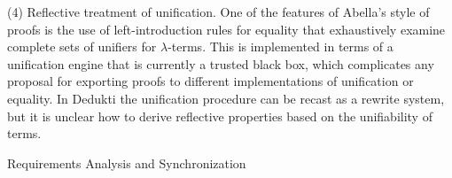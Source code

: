 \begin{workpackage}[id=theories,wphases=0-48,type=RTD,
  short=Theories in Dedukti,%
  title= Defining theories in Dedukti,
  lead=Inn,
  InnRM=10]
\begin{tasklist}
\begin{task}[id=abella,title=Express the theory of Abella in Dedukti and instrument the system]
(4) Reflective treatment of unification. One of the features of
Abella's style of proofs is the use of left-introduction rules for
equality that exhaustively examine complete sets of unifiers for
$\lambda$-terms. This is implemented in terms of a unification engine
that is currently a trusted black box, which complicates any proposal
for exporting proofs to different implementations of unification or
equality. In Dedukti the unification procedure can be recast as a
rewrite system, but it is unclear how to derive reflective properties
based on the unifiability of terms.
\end{task}

\begin{task}[title=id=hott,title=expressing HoTT]
\end{task}
\end{tasklist}

\begin{wpdelivs}
  \begin{wpdeliv}[due=3,miles=startup,id=requirements,dissem=PU,nature=DEM,lead=INR]
      {Requirements Analysis and Synchronization}
\end{wpdeliv}
\end{wpdelivs}
\end{workpackage}


